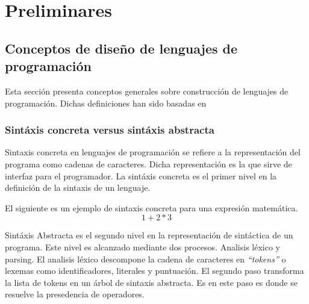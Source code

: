 \chapter{Preliminares}

\section{Conceptos de diseño de lenguajes de programación}

Esta sección presenta conceptos generales sobre construcción de lenguajes de
programación.  Dichas definiciones han sido basadas en~\cite{pierce:TAPL}

\subsection{Sintáxis concreta versus sintáxis abstracta}

\begin{defi}{
    Sintaxis concreta en lenguajes de programación se refiere a la representación del
    programa como cadenas de caracteres. Dicha representación es la que sirve de
    interfaz para el programador.  La sintáxis concreta es el primer nivel en la
    definición de la sintaxis de un lenguaje.}
\end{defi}

\begin{ejem}
  \label{sConcreta} 
  El siguiente es un ejemplo de sintaxis concreta para una expresión matemática.
  $$1 + 2 * 3$$
\end{ejem}

\begin{defi}
  Sintáxis Abstracta es el segundo nivel en la representación de sintáctica de un
  programa. Este nivel es alcanzado mediante dos procesos. Analisis léxico y parsing.
  El analisis léxico descompone la cadena de caracteres en \textit{``tokens''} o
  lexemas como identificadores, literales y puntuación. El segundo paso transforma la
  lista de tokens en un árbol de sintaxis abstracta. Es en este paso es donde se
  resuelve la presedencia de operadores.
\end{defi}


